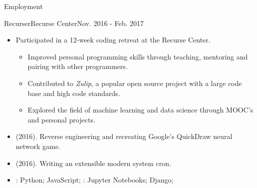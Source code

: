 \documentclass[]{mcdowellcv}
\begin{document}
    \makeheader

    \begin{cvsection}{Employment}

        \begin{cvsubsection}{Recurser}{Recurse Center}{Nov. 2016 - Feb. 2017}
            \begin{itemize}
                \item Participated in a 12-week coding retreat at the Recurse Center.
                \begin{itemize}
                    \item Improved personal programming skills through teaching, mentoring and pairing with other programmers.
                    \item Contributed to \textit{Zulip}, a popular open source project with a large code base and high code standards.
                    \item Explored the field of machine learning and data science through MOOC's and personal projects.
                \end{itemize}
            \end{itemize}
            \begin{itemize}
                \item {} (2016). Reverse engineering and recreating Google's QuickDraw neural network game.
                \item {} (2016). Writing an extensible modern system cron.
            \end{itemize}
            \begin{itemize}
                 \item {}: Python; JavaScript; \newline
                : Jupyter Notebooks; Django;
            \end{itemize}
        \end{cvsubsection}


\end{cvsection}
\end{document}
